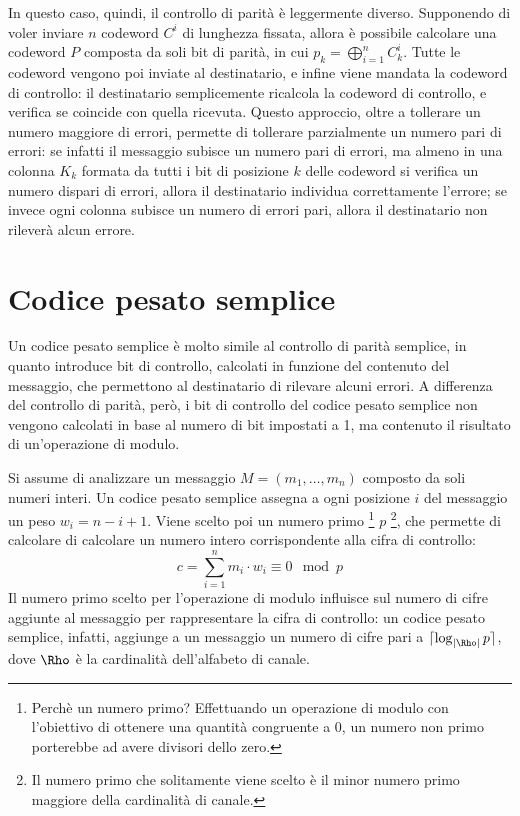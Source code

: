 In questo caso, quindi, il controllo di parità è leggermente diverso.
Supponendo di voler inviare $n$ codeword $C^i$ di lunghezza fissata, allora
è possibile calcolare una codeword $P$ composta da soli bit di parità,
in cui $p_k = \bigoplus_{i=1}^{n} C^{i}_{k}$.
Tutte le codeword vengono poi inviate al destinatario, e infine viene mandata
la codeword di controllo: il destinatario semplicemente ricalcola la
codeword di controllo, e verifica se coincide con quella ricevuta.
Questo approccio, oltre a tollerare un numero maggiore di errori, permette
di tollerare parzialmente un numero pari di errori: se infatti il messaggio
subisce un numero pari di errori, ma almeno in una colonna $K_k$ formata
da tutti i bit di posizione $k$ delle codeword si verifica un numero dispari di errori,
allora il destinatario individua correttamente l'errore; se invece ogni
colonna subisce un numero di errori pari, allora il destinatario non rileverà
alcun errore.

\section{Codice pesato semplice}
Un codice pesato semplice è molto simile al controllo di parità semplice,
in quanto introduce bit di controllo, calcolati in funzione del contenuto
del messaggio, che permettono al destinatario di rilevare alcuni errori.
A differenza del controllo di parità, però, i bit di controllo del
codice pesato semplice non vengono calcolati in base al numero di bit impostati
a 1, ma contenuto il risultato di un'operazione di modulo.

Si assume di analizzare un messaggio $M = (m_1, \ldots, m_n)$ composto
da soli numeri interi.
Un codice pesato semplice assegna a ogni posizione $i$ del messaggio un peso $w_i=n-i+1$.
Viene scelto poi un numero primo \footnote{Perchè un numero primo?
Effettuando un operazione di modulo con l'obiettivo di ottenere una quantità
congruente a 0, un numero non primo porterebbe ad avere divisori dello zero.}
$p$ \footnote{Il numero primo che solitamente viene scelto è il minor
numero primo maggiore della cardinalità di canale.},
che permette di calcolare di calcolare un numero intero corrispondente alla cifra di controllo:
\[
    c = \sum_{i=1}^{n} m_i \cdot w_i \equiv 0 \mod p
\]
Il numero primo scelto per l'operazione di modulo influisce sul numero di cifre
aggiunte al messaggio per rappresentare la cifra di controllo: un codice
pesato semplice, infatti, aggiunge a un messaggio un numero di cifre pari a
$\lceil \log_{|\Rho|} p \rceil$, dove $\Rho$ è la cardinalità dell'alfabeto
di canale.
